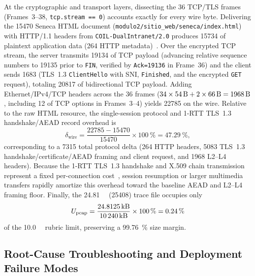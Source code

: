 At the cryptographic and transport layers, dissecting the 36 TCP/TLS frames (Frames~3--38, \texttt{tcp.stream == 0}) accounts exactly for every wire byte. Delivering the \qty{15470}{\byte} Seneca HTML document (\nolinkurl{modulo2/sitio_web/seneca/index.html}) with HTTP/1.1 headers from \texttt{COIL-DualIntranet/2.0} produces \qty{15734}{\byte} of plaintext application data (\qty{264}{\byte} HTTP metadata)~\cite{rfc9110}. Over the encrypted TCP stream, the server transmits \qty{19134}{\byte} of TCP payload (advancing relative sequence numbers to \num{19135} prior to \texttt{FIN}, verified by \texttt{Ack=19136} in Frame~36) and the client sends \qty{1683}{\byte} (TLS~1.3 \texttt{ClientHello} with SNI, \texttt{Finished}, and the encrypted \texttt{GET} request), totaling \qty{20817}{\byte} of bidirectional TCP payload. Adding Ethernet/IPv4/TCP headers across the 36 frames ($34 \times \qty{54}{\byte} + 2 \times \qty{66}{\byte} = \qty{1968}{\byte}$, including \qty{12}{\byte} of TCP options in Frames~3--4) yields \qty{22785}{\byte} on the wire. Relative to the raw HTML resource, the single-session protocol and 1-RTT TLS~1.3 handshake/AEAD record overhead is
\begin{equation}
\delta_{\text{wire}} = \frac{22785 - 15470}{15470} \times \qty{100}{\percent} = \qty{47.29}{\percent},
\label{eq:wire_overhead}
\end{equation}
corresponding to a \qty{7315}{\byte} total protocol delta (\qty{264}{\byte} HTTP headers, \qty{5083}{\byte} TLS~1.3 handshake/certificate/AEAD framing and client request, and \qty{1968}{\byte} L2--L4 headers). Because the 1-RTT TLS~1.3 handshake and X.509 chain transmission represent a fixed per-connection cost~\cite{rfc8446,rfc5280}, session resumption or larger multimedia transfers rapidly amortize this overhead toward the baseline AEAD and L2--L4 framing floor. Finally, the \qty{24.81}{\kilo\byte} (\qty{25408}{\byte}) trace file occupies only
\begin{equation}
U_{\text{pcap}} = \frac{\qty{24.8125}{\kilo\byte}}{\qty{10240}{\kilo\byte}} \times \qty{100}{\percent} = \qty{0.24}{\percent}
\label{eq:pcap_util}
\end{equation}
of the \qty{10.0}{\mega\byte} rubric limit, preserving a \qty{99.76}{\percent} size margin.

\subsection{Root-Cause Troubleshooting and Deployment Failure Modes}
\label{subsec:troubleshooting}

